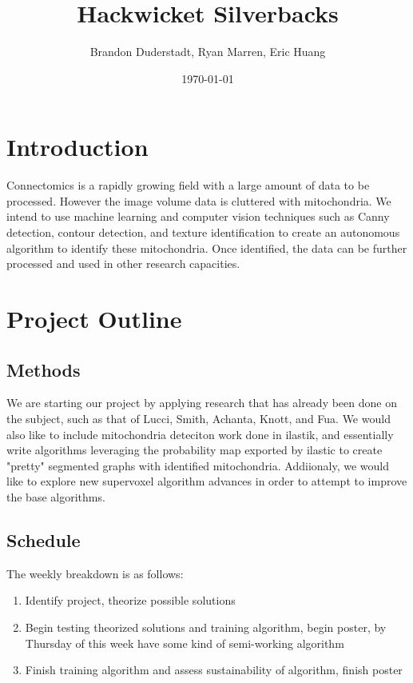 \documentclass[a4paper]{article}
\title{Hackwicket Silverbacks}
\author{Brandon Duderstadt, Ryan Marren, Eric Huang}
\date{\today}
\begin{document}
\maketitle

\section{Introduction}

Connectomics is a rapidly growing field with a large amount of data to be processed. However the image volume data is cluttered with mitochondria. We intend to use machine learning and computer vision techniques such as Canny detection, contour detection, and texture identification to create an autonomous algorithm to identify these mitochondria. Once identified, the data can be further processed and used in other research capacities.

\section{Project Outline}
\subsection{Methods}
We are starting our project by applying research that has already been done on the subject, such as that of Lucci, Smith, Achanta, Knott, and Fua. We would also like to include mitochondria deteciton work done in ilastik, and essentially write algorithms leveraging the probability map exported by ilastic to create "pretty" segmented graphs with identified mitochondria. Addiionaly, we would like to explore new supervoxel algorithm advances in order to attempt to improve the base algorithms.

\subsection{Schedule}
The weekly breakdown is as follows:
\begin{enumerate}
	\item Identify project, theorize possible solutions
    \item Begin testing theorized solutions and training algorithm, begin poster, by Thursday of this week have some kind of semi-working algorithm
    \item Finish training algorithm and assess sustainability of algorithm, finish poster
\end{enumerate}
\end{document}
